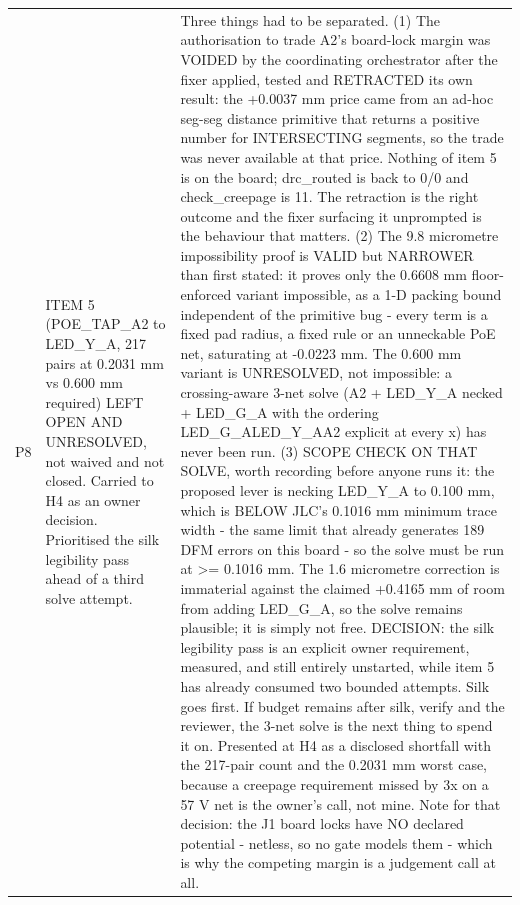 \documentclass[11pt,a4paper]{article}
\begin{document}
{\begin{longtable}{lp{5.2cm}p{7.2cm}}
P8 & ITEM 5 (POE\_TAP\_A2 to LED\_Y\_A, 217 pairs at 0.2031 mm vs 0.600 mm required) LEFT OPEN AND UNRESOLVED, not waived and not closed. Carried to H4 as an owner decision. Prioritised the silk legibility pass ahead of a third solve attempt. & Three things had to be separated. (1) The authorisation to trade A2's board-lock margin was VOIDED by the coordinating orchestrator after the fixer applied, tested and RETRACTED its own result: the +0.0037 mm price came from an ad-hoc seg-seg distance primitive that returns a positive number for INTERSECTING segments, so the trade was never available at that price. Nothing of item 5 is on the board; drc\_routed is back to 0/0 and check\_creepage is 11. The retraction is the right outcome and the fixer surfacing it unprompted is the behaviour that matters. (2) The 9.8 micrometre impossibility proof is VALID but NARROWER than first stated: it proves only the 0.6608 mm floor-enforced variant impossible, as a 1-D packing bound independent of the primitive bug - every term is a fixed pad radius, a fixed rule or an unneckable PoE net, saturating at -0.0223 mm. The 0.600 mm variant is UNRESOLVED, not impossible: a crossing-aware 3-net solve (A2 + LED\_Y\_A necked + LED\_G\_A with the ordering LED\_G\_A\textbar{}LED\_Y\_A\textbar{}A2 explicit at every x) has never been run. (3) SCOPE CHECK ON THAT SOLVE, worth recording before anyone runs it: the proposed lever is necking LED\_Y\_A to 0.100 mm, which is BELOW JLC's 0.1016 mm minimum trace width - the same limit that already generates 189 DFM errors on this board - so the solve must be run at \textgreater{}= 0.1016 mm. The 1.6 micrometre correction is immaterial against the claimed +0.4165 mm of room from adding LED\_G\_A, so the solve remains plausible; it is simply not free. DECISION: the silk legibility pass is an explicit owner requirement, measured, and still entirely unstarted, while item 5 has already consumed two bounded attempts. Silk goes first. If budget remains after silk, verify and the reviewer, the 3-net solve is the next thing to spend it on. Presented at H4 as a disclosed shortfall with the 217-pair count and the 0.2031 mm worst case, because a creepage requirement missed by 3x on a 57 V net is the owner's call, not mine. Note for that decision: the J1 board locks have NO declared potential - netless, so no gate models them - which is why the competing margin is a judgement call at all. \\

\end{longtable}}
\end{document}
